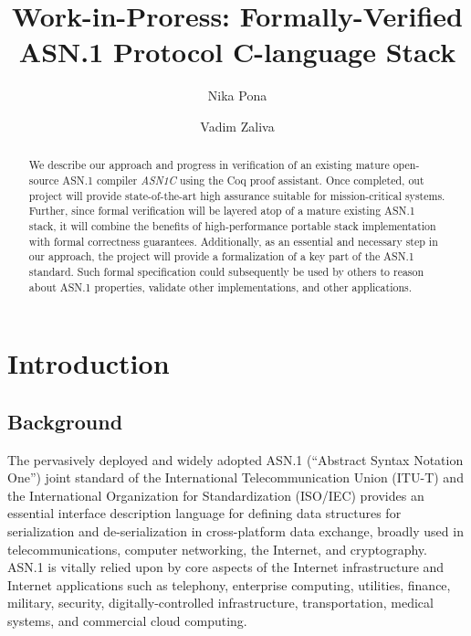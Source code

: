 \documentclass[acmsmall,nonacm]{acmart}
\begin{document}
\title{Work-in-Proress: Formally-Verified ASN.1 Protocol C-language Stack}

\author{Nika Pona}
\author{Vadim Zaliva}

\begin{abstract}

  We describe our approach and progress in verification of an existing
  mature open-source ASN.1 compiler \emph{ASN1C} using the Coq proof
  assistant. Once completed, out project will provide state-of-the-art
  high assurance suitable for mission-critical systems. Further, since
  formal verification will be layered atop of a mature existing ASN.1
  stack, it will combine the benefits of high-performance portable
  stack implementation with formal correctness
  guarantees. Additionally, as an essential and necessary step in our
  approach, the project will provide a formalization of a key part of
  the ASN.1 standard. Such formal specification could subsequently be
  used by others to reason about ASN.1 properties, validate other
  implementations, and other applications.

\end{abstract}

\maketitle

\tableofcontents

\section{Introduction}

\subsection{Background}

The pervasively deployed and widely adopted ASN.1 (``Abstract Syntax
Notation One'') \cite{ASN1Intro} joint standard of the International
Telecommunication Union (ITU-T) and the International Organization for
Standardization (ISO/IEC) provides an essential interface description
language for defining data structures for serialization and
de-serialization in cross-platform data exchange, broadly used in
telecommunications, computer networking, the Internet, and
cryptography. ASN.1 is vitally relied upon by core aspects of the
Internet infrastructure and Internet applications such as telephony,
enterprise computing, utilities, finance, military, security,
digitally-controlled infrastructure, transportation, medical systems,
and commercial cloud computing.
\end{document}
